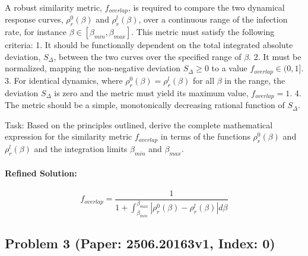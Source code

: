 \documentclass[10pt]{article}
\begin{document}
A robust similarity metric, $f_{overlap}$, is required to compare the two dynamical response curves, $\rho_r^0(\beta)$ and $\rho_r^l(\beta)$, over a continuous range of the infection rate, for instance $\beta \in [\beta_{min}, \beta_{max}]$. This metric must satisfy the following criteria:
1. It should be functionally dependent on the total integrated absolute deviation, $S_{\Delta}$, between the two curves over the specified range of $\beta$.
2. It must be normalized, mapping the non-negative deviation $S_{\Delta} \ge 0$ to a value $f_{overlap} \in (0, 1]$.
3. For identical dynamics, where $\rho_r^0(\beta) = \rho_r^l(\beta)$ for all $\beta$ in the range, the deviation $S_{\Delta}$ is zero and the metric must yield its maximum value, $f_{overlap} = 1$.
4. The metric should be a simple, monotonically decreasing rational function of $S_{\Delta}$.

Task:
Based on the principles outlined, derive the complete mathematical expression for the similarity metric $f_{overlap}$ in terms of the functions $\rho_r^0(\beta)$ and $\rho_r^l(\beta)$ and the integration limits $\beta_{min}$ and $\beta_{max}$.

\paragraph*{Refined Solution:}
\[ f_{overlap} = \frac{1}{1 + \int_{\beta_{min}}^{\beta_{max}} |\rho_r^0(\beta) - \rho_r^l(\beta)| d\beta} \]

\newpage
\subsection*{Problem 3 (Paper: 2506.20163v1, Index: 0)}
\end{document}
